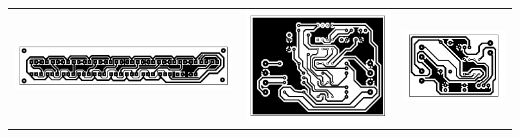 \begin{tabular}{ccc}
  \begin{minipage}{0.32\textwidth}
    \centering
    \includegraphics[width=\textwidth,height=0.2\textheight,keepaspectratio]{PCBS/Alarmas.pdf} %
  \end{minipage} &
  \begin{minipage}{0.32\textwidth}
    \centering
    \includegraphics[width=\textwidth,height=0.2\textheight,keepaspectratio]{PCBS/AD620 PCB.pdf} %
  \end{minipage} &
  \begin{minipage}{0.32\textwidth}
    \centering
    \includegraphics[width=\textwidth,height=0.2\textheight,keepaspectratio]{PCBS/Acondicionador PCB.pdf} %
  \end{minipage} \\
\end{tabular}


